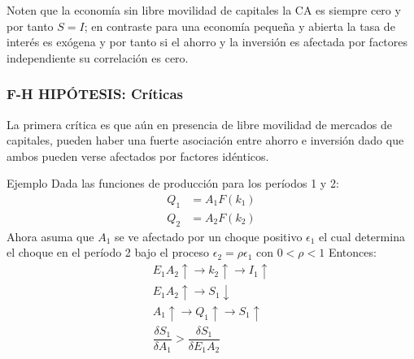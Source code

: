 \documentclass[10pt, xcolor=table, x11names]{beamer}
\begin{document}
\begin{frame}[plain, label=3]
	Noten que la economía sin libre movilidad de capitales la CA es siempre cero y por tanto $S=I$; en contraste para una economía pequeña y abierta la tasa de interés es exógena y por tanto si el ahorro y la inversión es afectada por factores independiente su correlación es cero.
	
	
\end{frame}

\begin{frame}[plain,label=4]
	\frametitle{{\normalsize F-H HIPÓTESIS: Críticas } {}}
	La primera crítica es que aún en presencia de libre movilidad de mercados de capitales, pueden haber una fuerte asociación entre ahorro e inversión dado que ambos pueden verse afectados por factores idénticos. 
	\begin{block}{Ejemplo}
		Dada las funciones de producción para los períodos 1 y 2:
		\begin{align}
		Q_{1}&=A_{1}F(k_{1})\nonumber\\
		Q_{2}&=A_{2}F(k_{2})\nonumber
		\end{align}
		Ahora asuma que $A_{1}$ se ve afectado por un choque positivo $\epsilon_{1}$ el cual determina el choque en el período 2 bajo el proceso $\epsilon_{2}=\rho\epsilon_{1} $ con $ 0<\rho<1$
		Entonces:
		\begin{align}
		E_{1}A_{2}\uparrow\rightarrow k_{2}\uparrow\rightarrow I_{1}\uparrow \nonumber\\
		E_{1}A_{2}\uparrow\rightarrow S_{1}\downarrow\nonumber\\
		A_{1}\uparrow\rightarrow Q_{1}\uparrow\rightarrow S_{1}\uparrow\nonumber\\
		\dfrac{\delta S_{1}}{\delta A_{1}}>	\dfrac{\delta S_{1}}{\delta E_{1}A_{2}}\nonumber	
		\end{align}
	\end{block}
	
\end{frame}
\end{document}
